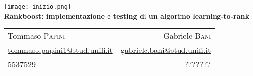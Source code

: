 \begin{center}
   	\texttt{[image: inizio.png]}\\[0.8cm]
	{\huge\bfseries Rankboost: implementazione e testing di un algorimo learning-to-rank}\\[0.8cm]

	\begin{tabular*}{\linewidth}{@{\extracolsep{\fill}}lr}
		Tommaso \textsc{Papini} & Gabriele \textsc{Bani}\\
		\href{mailto:tommaso.papini1@stud.unifi.it}{tommaso.papini1@stud.unifi.it} & \href{mailto:gabriele.bani@stud.unifi.it}{gabriele.bani@stud.unifi.it}\\
		5537529 & ???????
	\end{tabular*}\\[1.2cm]
\end{center}
